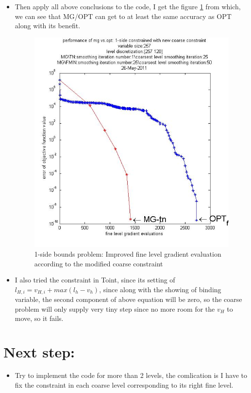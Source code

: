 \documentclass[10pt]{article}
\begin{document}
\begin{itemize}
\item Then apply all above conclusions to the code, I get the figure \ref{fig:newb} from which, we can see that MG/OPT can get to at least the same accuracy as OPT along with its benefit.
\begin{figure}[h]
\centering
  \includegraphics[width=1.0\textwidth]{newcoarsebound257.jpg}
  \caption{1-side bounds problem:  Improved fine level gradient evaluation according to the modified coarse constraint}
\label{fig:newb}
\end{figure}



\item I also tried the constraint in Toint, since its setting of $l_{H,i}=v_{H,i}+max(l_{h}-v_{h})$, since along with the showing of binding variable, the second component of above equation will be zero, so the coarse problem will only supply very tiny step since no more room for the $v_{H}$ to move, so it fails.
\end{itemize}

\section {Next step:}
\begin{itemize}
\item Try to implement the code for more than 2 levels, the comlication is I have to fix the constraint in each coarse level corresponding to its right fine level.
\end{itemize}
\end{document}
